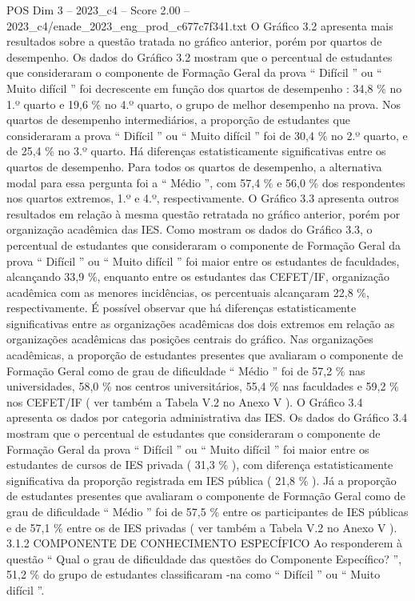 \begin{textsample}{POS Dim 3 – 2023\_c4 – Score 2.00 – 2023\_c4/enade\_2023\_eng\_prod\_c677c7f341.txt}
O Gráfico 3.2 apresenta mais resultados sobre a questão tratada no gráfico anterior, porém por quartos de desempenho.
Os dados do Gráfico 3.2 mostram que o percentual de estudantes que consideraram o componente de Formação Geral da prova “ Difícil ” ou “ Muito difícil ” foi decrescente em função dos quartos de desempenho : 34,8 \% no 1.º quarto e 19,6 \% no 4.º quarto, o grupo de melhor desempenho na prova.
Nos quartos de desempenho intermediários, a proporção de estudantes que consideraram a prova “ Difícil ” ou “ Muito difícil ” foi de 30,4 \% no 2.º quarto, e de 25,4 \% no 3.º quarto.
Há diferenças estatisticamente significativas entre os quartos de desempenho.
Para todos os quartos de desempenho, a alternativa modal para essa pergunta foi a “ Médio ”, com 57,4 \% e 56,0 \% dos respondentes nos quartos extremos, 1.º e 4.º, respectivamente.
O Gráfico 3.3 apresenta outros resultados em relação à mesma questão retratada no gráfico anterior, porém por organização acadêmica das IES.
Como mostram os dados do Gráfico 3.3, o percentual de estudantes que consideraram o componente de Formação Geral da prova “ Difícil ” ou “ Muito difícil ” foi maior entre os estudantes de faculdades, alcançando 33,9 \%, enquanto entre os estudantes das CEFET/IF, organização acadêmica com as menores incidências, os percentuais alcançaram 22,8 \%, respectivamente.
É possível observar que há diferenças estatisticamente significativas entre as organizações acadêmicas dos dois extremos em relação as organizações acadêmicas das posições centrais do gráfico.
Nas organizações acadêmicas, a proporção de estudantes presentes que avaliaram o componente de Formação Geral como de grau de dificuldade “ Médio ” foi de 57,2 \% nas universidades, 58,0 \% nos centros universitários, 55,4 \% nas faculdades e 59,2 \% nos CEFET/IF ( ver também a Tabela V.2 no Anexo V ).
O Gráfico 3.4 apresenta os dados por categoria administrativa das IES.
Os dados do Gráfico 3.4 mostram que o percentual de estudantes que consideraram o componente de Formação Geral da prova “ Difícil ” ou “ Muito difícil ” foi maior entre os estudantes de cursos de IES privada ( 31,3 \% ), com diferença estatisticamente significativa da proporção registrada em IES pública ( 21,8 \% ).
Já a proporção de estudantes presentes que avaliaram o componente de Formação Geral como de grau de dificuldade “ Médio ” foi de 57,5 \% entre os participantes de IES públicas e de 57,1 \% entre os de IES privadas ( ver também a Tabela V.2 no Anexo V ). 3.1.2 COMPONENTE DE CONHECIMENTO ESPECÍFICO Ao responderem à questão “ Qual o grau de dificuldade das questões do Componente Específico? ”, 51,2 \% do grupo de estudantes classificaram -na como “ Difícil ” ou “ Muito difícil ”.

\end{textsample}
